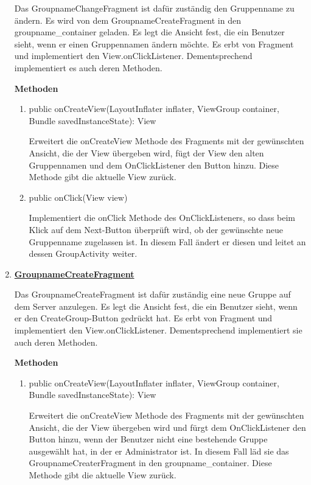 \begin{enumerate}
	Das GroupnameChangeFragment ist dafür zuständig den Gruppenname zu ändern. Es wird von dem GroupnameCreateFragment in den groupname\_container geladen. Es legt die Ansicht fest, die ein Benutzer sieht, wenn er einen Gruppennamen ändern möchte. Es erbt von Fragment und implementiert den View.onClickListener. Dementsprechend implementiert es auch deren Methoden.
	
	\textbf{Methoden}	
	\begin{enumerate}
		\item public onCreateView(LayoutInflater inflater, ViewGroup container, Bundle savedInstanceState): View
		
		Erweitert die onCreateView Methode des Fragments mit der gewünschten Ansicht, die der View übergeben wird, fügt der View den alten Gruppennamen und dem OnClickListener den Button hinzu. Diese Methode gibt die aktuelle View zurück.
		
		\item public onClick(View view)
		
		Implementiert die onClick Methode des OnClickListeners, so dass beim Klick auf dem Next-Button überprüft wird, ob der gewünschte neue Gruppenname zugelassen ist. In diesem Fall ändert er diesen und leitet an dessen GroupActivity weiter.
	\end{enumerate}

	\item \textbf{\underline{GroupnameCreateFragment}}
	
	Das GroupnameCreateFragment ist dafür zuständig eine neue Gruppe auf dem Server anzulegen. Es legt die Ansicht fest, die ein Benutzer sieht, wenn er den CreateGroup-Button gedrückt hat. Es erbt von Fragment und implementiert den View.onClickListener. Dementsprechend implementiert sie auch deren Methoden.
	
	\textbf{Methoden}
	
	\begin{enumerate}
		\item public onCreateView(LayoutInflater inflater, ViewGroup container, Bundle savedInstanceState): View
		
		Erweitert die onCreateView Methode des Fragments mit der gewünschten Ansicht, die der View übergeben wird und fürgt dem OnClickListener den Button hinzu, wenn der Benutzer nicht eine bestehende Gruppe ausgewählt hat, in der er Administrator ist. In diesem Fall läd sie das GroupnameCreaterFragment in den groupname\_container. Diese Methode gibt die aktuelle View zurück.
		

\end{enumerate}
\end{enumerate}
